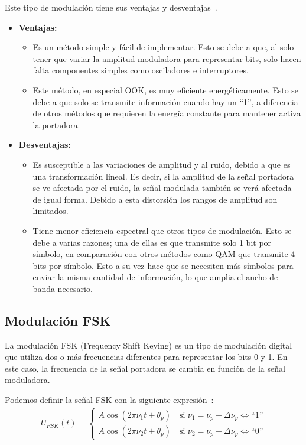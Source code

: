 \documentclass[12pt, letterpaper]{article}
\begin{document}
\newpage
Este tipo de modulación tiene sus ventajas y desventajas~\cite{ventajas-desventajas-ask}.
\begin{itemize}
    \item \textbf{Ventajas:}
    \begin{itemize}
        \item Es un método simple y fácil de implementar. Esto se debe a que, al solo tener que variar la amplitud moduladora para representar bits, solo hacen falta componentes simples como osciladores e interruptores. 
        \item Este método, en especial OOK, es muy eficiente  energéticamente. Esto se debe a que solo se transmite información cuando hay un ``1'', a diferencia de otros métodos que requieren la energía constante para mantener activa la portadora.
    \end{itemize}

    \item \textbf{Desventajas:}
    \begin{itemize}
        \item Es susceptible a las variaciones de amplitud y al ruido, debido a que es una transformación lineal. Es decir, si la amplitud de la señal portadora se ve afectada por el ruido, la señal modulada también se verá afectada de igual forma. Debido a esta distorsión los rangos de amplitud son limitados.
        \item Tiene menor eficiencia espectral que otros tipos de modulación. Esto se debe a varias razones; una de ellas es que transmite solo 1 bit por símbolo, en comparación con otros métodos como QAM que transmite 4 bits por símbolo. Esto a su vez hace que se necesiten más símbolos para enviar la misma cantidad de información, lo que amplia el ancho de banda necesario.
    \end{itemize}
\end{itemize}

\subsection{Modulación FSK}
La modulación FSK (Frequency Shift Keying) es un tipo de modulación digital que utiliza dos o más frecuencias diferentes para representar los bits 0 y 1. En este caso, la frecuencia de la señal portadora se cambia en función de la señal moduladora.

Podemos definir la señal FSK con la siguiente expresión~\cite{modulacion-uv}:
\begin{align}
    U_{FSK}(t) =
    \left\{
    \begin{array}{l}
        A \cos(2\pi\nu_1 t + \theta_p) \quad 
        \text{si } \nu_1 = \nu_p + \Delta\nu_p \Leftrightarrow \text{``1''} \\
        A \cos(2\pi\nu_2 t + \theta_p) \quad
        \text{si } \nu_2 = \nu_p - \Delta\nu_p \Leftrightarrow \text{``0''}
    \end{array}
    \right. \label{eq:fsk}
\end{align}
\end{document}
